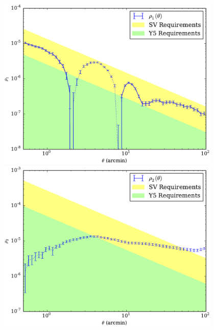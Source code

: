 \documentclass{beamer}
\begin{document}
{\begin{columns}
\begin{column}{0.55\textwidth}
            \begin{center}
                \includegraphics[width=0.8\textwidth]{rho1-psfex-crop.pdf}
                \newline
                \includegraphics[width=0.8\textwidth]{rho2-psfex-crop.pdf}
                \newline


            \end{center}
        \end{column}
    \end{columns}

}
\end{document}
